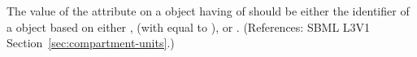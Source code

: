 The value of the attribute  on a \Compartment object having
 of  should be either 
 the identifier of a \UnitDefinition object based on either
,  (with  equal to ), or
.  (References: SBML L3V1
Section~\ref{sec:compartment-units}.)
